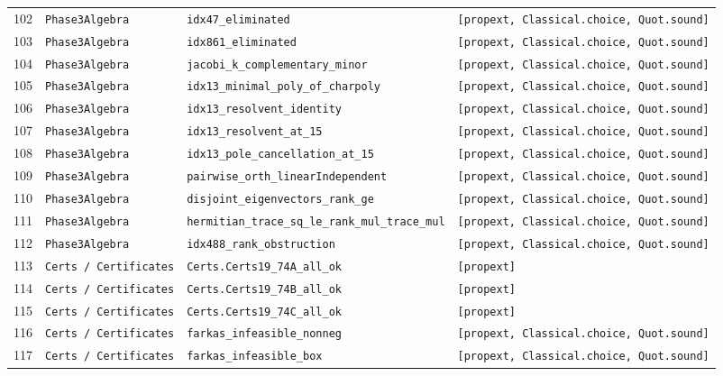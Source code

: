 \documentclass[11pt,reqno]{amsart}
\theoremstyle{definition}
\theoremstyle{remark}
\numberwithin{equation}{section}
\numberwithin{table}{section}
\begin{document}
{\begin{longtable}{@{}r>{\raggedright\arraybackslash}p{1.2in}>{\raggedright\arraybackslash}p{2.55in}>{\raggedright\arraybackslash}p{1.85in}@{}}
102 & \nolinkurl{Phase3Algebra} & \nolinkurl{idx47_eliminated} & \texttt{[propext, Classical.choice, Quot.sound]} \\
103 & \nolinkurl{Phase3Algebra} & \nolinkurl{idx861_eliminated} & \texttt{[propext, Classical.choice, Quot.sound]} \\
104 & \nolinkurl{Phase3Algebra} & \nolinkurl{jacobi_k_complementary_minor} & \texttt{[propext, Classical.choice, Quot.sound]} \\
105 & \nolinkurl{Phase3Algebra} & \nolinkurl{idx13_minimal_poly_of_charpoly} & \texttt{[propext, Classical.choice, Quot.sound]} \\
106 & \nolinkurl{Phase3Algebra} & \nolinkurl{idx13_resolvent_identity} & \texttt{[propext, Classical.choice, Quot.sound]} \\
107 & \nolinkurl{Phase3Algebra} & \nolinkurl{idx13_resolvent_at_15} & \texttt{[propext, Classical.choice, Quot.sound]} \\
108 & \nolinkurl{Phase3Algebra} & \nolinkurl{idx13_pole_cancellation_at_15} & \texttt{[propext, Classical.choice, Quot.sound]} \\
109 & \nolinkurl{Phase3Algebra} & \nolinkurl{pairwise_orth_linearIndependent} & \texttt{[propext, Classical.choice, Quot.sound]} \\
110 & \nolinkurl{Phase3Algebra} & \nolinkurl{disjoint_eigenvectors_rank_ge} & \texttt{[propext, Classical.choice, Quot.sound]} \\
111 & \nolinkurl{Phase3Algebra} & \nolinkurl{hermitian_trace_sq_le_rank_mul_trace_mul} & \texttt{[propext, Classical.choice, Quot.sound]} \\
112 & \nolinkurl{Phase3Algebra} & \nolinkurl{idx488_rank_obstruction} & \texttt{[propext, Classical.choice, Quot.sound]} \\
113 & \nolinkurl{Certs / Certificates} & \nolinkurl{Certs.Certs19_74A_all_ok} & \texttt{[propext]} \\
114 & \nolinkurl{Certs / Certificates} & \nolinkurl{Certs.Certs19_74B_all_ok} & \texttt{[propext]} \\
115 & \nolinkurl{Certs / Certificates} & \nolinkurl{Certs.Certs19_74C_all_ok} & \texttt{[propext]} \\
116 & \nolinkurl{Certs / Certificates} & \nolinkurl{farkas_infeasible_nonneg} & \texttt{[propext, Classical.choice, Quot.sound]} \\
117 & \nolinkurl{Certs / Certificates} & \nolinkurl{farkas_infeasible_box} & \texttt{[propext, Classical.choice, Quot.sound]} \\

\end{longtable}}
\end{document}
